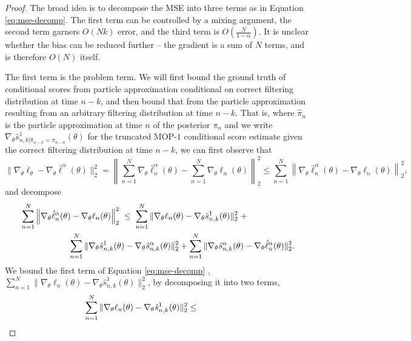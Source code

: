 \begin{proof}
    
The broad idea is to decompose the MSE into three terms as in Equation \ref{eq:mse-decomp}. The first term can be controlled by a mixing argument, the second term garners $O(Nk)$ error, and the third term is $O\left(\frac{N}{1-\alpha}\right)$. It is unclear whether the bias can be reduced further -- the gradient is a sum of $N$ terms, and is therefore $O(N)$ itself. 

The first term is the problem term. We will first bound the ground truth of conditional scores from particle approximation conditional on correct filtering distribution at time $n-k$, and then bound that from the particle approximation resulting from an arbitrary filtering distribution at time $n-k$. That is, where $\hat\pi_n$ is the particle approximation at time $n$ of the posterior $\pi_n$ and we write $\nabla_\theta\hat s_{n,k|\hat\pi_{n-k}=\pi_{n-k}}^1(\theta)$ for the truncated MOP-$1$ conditional score estimate given the correct filtering distribution at time $n-k$, we can first observe that
\begin{equation}
    \big\|\nabla_\theta\ell_\theta - \nabla_\theta \hat\ell^\alpha(\theta)\big\|_2^2 =  \left\lVert\sum_{n=1}^N \nabla_\theta \hat\ell_n^\alpha(\theta) - \sum_{n=1}^N \nabla_\theta \ell_n(\theta)\right\rVert_2^2 \leq \sum_{n=1}^N\left\lVert \nabla_\theta \hat\ell_n^\alpha(\theta) -  \nabla_\theta \ell_n(\theta)\right\rVert_2^2,
\end{equation}
and decompose
\begin{align} \nonumber
    & \sum_{n=1}^N\left\lVert \nabla_\theta \hat\ell_n^\alpha(\theta) -  \nabla_\theta \ell_n(\theta)\right\rVert_2^2 \; \leq  \; \sum_{n=1}^N\|\nabla_\theta\ell_n(\theta) - \nabla_\theta\hat s_{n,k}^1(\theta)\|_2^2  \; +
     \\ & \hspace{20mm}
     \sum_{n=1}^N\|\nabla_\theta\hat s_{n,k}^1(\theta) - \nabla_\theta\hat s_{n,k}^\alpha(\theta)\|_2^2 + \sum_{n=1}^N\|\nabla_\theta\hat s_{n,k}^\alpha(\theta) -  \nabla_\theta\hat\ell_n^\alpha(\theta)\|_2^2. \label{eq:mse-decomp}
\end{align}
We bound the first term of Equation \ref{eq:mse-decomp} , $\sum_{n=1}^N\|\nabla_\theta\ell_n(\theta) - \nabla_\theta\hat s_{n,k}^1(\theta)\|_2^2$, by decomposing it into two terms, 
\begin{eqnarray}
\nonumber
\hspace{-10mm} \sum_{n=1}^N\|\nabla_\theta\ell_n(\theta) - \nabla_\theta\hat s_{n,k}^1(\theta)\|_2^2 &\leq&

\end{eqnarray}
\end{proof}
